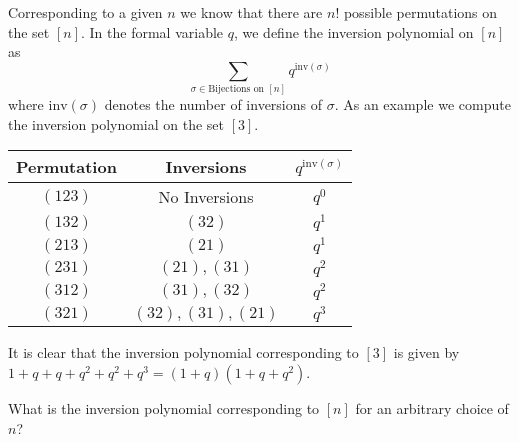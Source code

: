 Corresponding to a given $n$ we know that there are $n!$ possible permutations on the set $[n]$. In the formal variable $q$, we define the inversion polynomial on $[n]$ as \[\sum_{\sigma\in \text{Bijections on }[n]}q^{\text{inv}(\sigma)}\] where $\text{inv}(\sigma)$ denotes the number of inversions of $\sigma$.  As an example we compute the inversion polynomial on the set $[3]$.
\begin{center}
\begin{tabular}{|c|c|c|}
\hline
\textbf{Permutation} & \textbf{Inversions} & $q^{\text{inv}(\sigma)}$ \\
\hline
$(123)$ & No Inversions & $q^0$ \\
\hline
$(132)$ & $(32)$ & $q^1$ \\
\hline 
$(213)$ & $(21)$ & $q^1$ \\
\hline
$(231)$ & $(21),(31)$ & $q^2$ \\
\hline
$(312)$ & $(31),(32)$ & $q^2$\\
\hline
$(321)$ & $(32),(31),(21)$ & $q^3$\\
\hline
\end{tabular}
\label{tab:S3Example}
\end{center}
It is clear that the inversion polynomial corresponding to $[3]$ is given by $1+q+q+q^2+q^2+q^3=(1+q)(1+q+q^2)$.
\begin{question}
What is the inversion polynomial corresponding to $[n]$ for an arbitrary choice of $n$?
\end{question}
